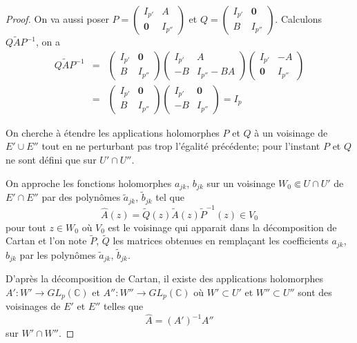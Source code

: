 \documentclass{article}
\theoremstyle{definition}
\theoremstyle{remark}
\begin{document}
\begin{proof}
On va aussi poser $P = \begin{pmatrix}
   I_{p'} & A \\
   \mathbf{0} & I_{p''} 
\end{pmatrix}$
et $Q = \begin{pmatrix}
   I_{p'} & \mathbf{0} \\
   B & I_{p''} 
\end{pmatrix}$. Calculons $Q\tilde{A}P^{-1}$, on a
\begin{eqnarray}
\nonumber Q\tilde{A}P^{-1} &=& \begin{pmatrix}
   I_{p'} & \mathbf{0} \\
   B & I_{p''} 
\end{pmatrix}
\begin{pmatrix}
   I_{p'} & A \\
   -B & I_{p''} - BA 
\end{pmatrix}
\begin{pmatrix}
   I_{p'} & -A \\
   \mathbf{0} & I_{p''} 
\end{pmatrix} \\
\nonumber &=& \begin{pmatrix}
   I_{p'} & \mathbf{0} \\
   B & I_{p''} 
\end{pmatrix}\begin{pmatrix}
   I_{p'} & \mathbf{0} \\
   -B & I_{p''} 
\end{pmatrix} = I_p
\end{eqnarray}

On cherche à étendre les applications holomorphes $P$ et $Q$ à un voisinage de $E' \cup E''$ tout en ne perturbant pas trop l'égalité précédente; pour l'instant $P$ et $Q$ ne sont défini que sur $U' \cap U''$.

On approche les fonctions holomorphes $a_{jk}$, $b_{jk}$ sur un voisinage $W_0 \Subset U \cap U'$ de $E'\cap E''$ par des polynômes $\tilde{a}_{jk}$, $\tilde{b}_{jk}$ tel que $$\hat{A}(z) = \tilde{Q}(z)\tilde{A}(z)\tilde{P}^{-1}(z) \in V_0$$ pour tout $z \in W_0$ où $V_0$ est le voisinage qui apparait dans la décomposition de Cartan et l'on note $\tilde{P}$, $\tilde{Q}$ les matrices obtenues en remplaçant les coefficients $a_{jk}$, $b_{jk}$ par les polynômes $\tilde{a}_{jk}$, $\tilde{b}_{jk}$.

D'après la décomposition de Cartan, il existe des applications holomorphes $A' : W' \to GL_p(\mathbb{C})$ et $A'' : W'' \to GL_p(\mathbb{C})$ où $W' \subset U'$ et $W'' \subset U''$ sont des voisinages de $E'$ et $E''$ telles que $$\hat{A} = (A')^{-1}A''$$ sur $W' \cap W''$.


\end{proof}
\end{document}
